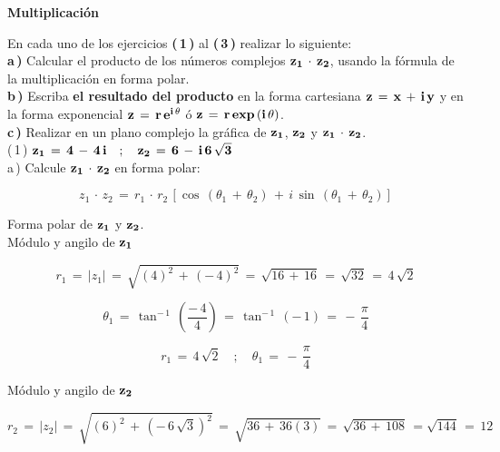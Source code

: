 \documentclass[a4paper,11pt,openany]{book}
\begin{document}
\newpage


\graphicspath{ {images/} }

\begin{center}
\textbf{Multiplicación}
\end{center}

En cada uno de los ejercicios \textbf{(\,1\,)} al \textbf{(\,3\,)} realizar lo siguiente:\\

\textbf{a\,)} Calcular el producto de los números complejos $\bf{z_{1}\,\cdot\,z_{2}}$, usando la fórmula de la multiplicación en forma polar.\\

\textbf{b\,)} Escriba \textbf{el resultado del producto} en la forma cartesiana $\bf{z\,=\,x\,+\,i\,y}$ y en la forma exponencial $\bf{z\,=\,r\,e^{i\,\theta}}$ ó $\bf{z\,=\,r\,exp\,(i\,\theta)}$.\\

\textbf{c\,)} Realizar en un plano complejo la gráfica de $\bf{z_{1}}$, $\bf{z_{2}}$ y $\bf{z_{1}\,\cdot\,z_{2}}$.\\

\textcolor{ao(english)}{(\,1\,)} $\bf{z_{1}\,=\,4\,-\,4\,i \quad;\quad z_{2}\,=\,6\,-\,i\,6\,\sqrt{3}}$\\

\textcolor{ao(english)}{a\,)} Calcule $\bf{z_{1}\,\cdot\,z_{2}}$ en forma polar:

$$z_{1}\,\cdot\,z_{2}\,=\,r_{1}\,\cdot\,r_{2}\,\left[\cos\,(\theta_{1}\,+\,\theta_{2})\,+\,i\,\sin\,(\theta_{1}\,+\,\theta_{2})\right]$$

\textcolor{ao(english)}{} Forma polar de $\bf{z_{1}}$ y $\bf{z_{2}}$.\\

\textcolor{ao(english)}{} Módulo y angilo de $\bf{z_{1}}$ 

$$r_{1}\,=\,|z_{1}|\,=\,\sqrt{(4)^{2}\,+\,(-\,4)^{2}}\,=\,\sqrt{16\,+\,16}\,=\,\sqrt{32}\,=\,4\,\sqrt{2}$$

$$\theta_{1}\,=\,\tan^{-\,1}\,\left(\dfrac{-\,4}{4}\right)\,=\,\tan^{-\,1}\,(-\,1)\,=\,-\,\dfrac{\pi}{4}$$

$$\boxed{r_{1}\,=\,4\,\sqrt{2} \quad;\quad \theta_{1}\,=\,-\,\dfrac{\pi}{4}}$$

\textcolor{ao(english)}{} Módulo y angilo de $\bf{z_{2}}$ 

$$r_{2}\,=\,|z_{2}|\,=\,\sqrt{(6)^{2}\,+\,\left(-\,6\,\sqrt{3}\right)^{2}}\,=\,\sqrt{36\,+\,36(3)}\,=\,\sqrt{36\,+\,108}\,=\sqrt{144}\,=\,12$$
\end{document}
